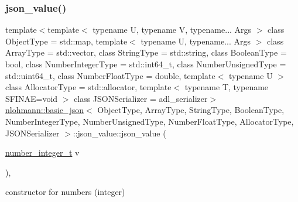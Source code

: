 \subsubsection{\texorpdfstring{json\+\_\+value()}{json\_value()}\hspace{0.1cm}{\footnotesize\ttfamily [3/12]}}
{\footnotesize\ttfamily template$<$template$<$ typename U, typename V, typename... Args $>$ class Object\+Type = std\+::map, template$<$ typename U, typename... Args $>$ class Array\+Type = std\+::vector, class String\+Type  = std\+::string, class Boolean\+Type  = bool, class Number\+Integer\+Type  = std\+::int64\+\_\+t, class Number\+Unsigned\+Type  = std\+::uint64\+\_\+t, class Number\+Float\+Type  = double, template$<$ typename U $>$ class Allocator\+Type = std\+::allocator, template$<$ typename T, typename S\+F\+I\+N\+A\+E=void $>$ class J\+S\+O\+N\+Serializer = adl\+\_\+serializer$>$ \\
\hyperlink{classnlohmann_1_1basic__json}{nlohmann\+::basic\+\_\+json}$<$ Object\+Type, Array\+Type, String\+Type, Boolean\+Type, Number\+Integer\+Type, Number\+Unsigned\+Type, Number\+Float\+Type, Allocator\+Type, J\+S\+O\+N\+Serializer $>$\+::json\+\_\+value\+::json\+\_\+value (\begin{DoxyParamCaption}\item[{\hyperlink{classnlohmann_1_1basic__json_a98e611d67b7bd75307de99c9358ab2dc}{number\+\_\+integer\+\_\+t}}]{v }\end{DoxyParamCaption})\hspace{0.3cm}{\ttfamily [inline]}, {\ttfamily [noexcept]}}



constructor for numbers (integer) 

\mbox{\label{unionnlohmann_1_1basic__json_1_1json__value_a0bac352145b02ec3dd280bbfef997a55}} 
